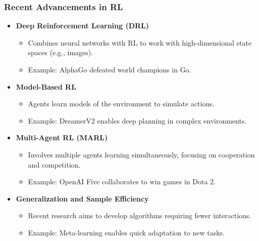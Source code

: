 \documentclass[aspectratio=169]{beamer}
\begin{document}
\begin{frame}[fragile]
    \frametitle{Recent Advancements in RL}
    \begin{itemize}
        \item \textbf{Deep Reinforcement Learning (DRL)}
            \begin{itemize}
                \item Combines neural networks with RL to work with high-dimensional state spaces (e.g., images).
                \item Example: AlphaGo defeated world champions in Go.
            \end{itemize}
        \item \textbf{Model-Based RL}
            \begin{itemize}
                \item Agents learn models of the environment to simulate actions.
                \item Example: DreamerV2 enables deep planning in complex environments.
            \end{itemize}
        \item \textbf{Multi-Agent RL (MARL)}
            \begin{itemize}
                \item Involves multiple agents learning simultaneously, focusing on cooperation and competition.
                \item Example: OpenAI Five collaborates to win games in Dota 2.
            \end{itemize}
        \item \textbf{Generalization and Sample Efficiency}
            \begin{itemize}
                \item Recent research aims to develop algorithms requiring fewer interactions.
                \item Example: Meta-learning enables quick adaptation to new tasks.
            \end{itemize}
    \end{itemize}
\end{frame}
\end{document}

